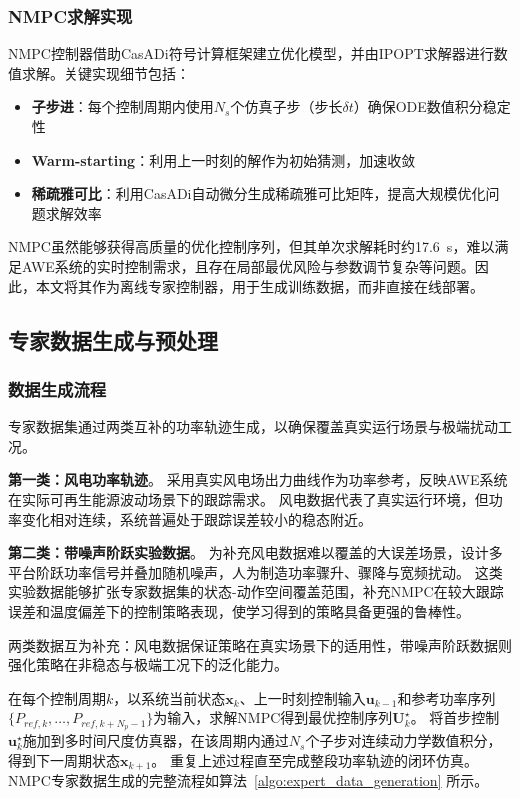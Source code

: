 \subsubsection{NMPC求解实现}

NMPC控制器借助CasADi符号计算框架建立优化模型，并由IPOPT求解器进行数值求解。关键实现细节包括：

\begin{itemize}
  \item \textbf{子步进}：每个控制周期内使用$N_s$个仿真子步（步长$\delta t$）确保ODE数值积分稳定性
  \item \textbf{Warm-starting}：利用上一时刻的解作为初始猜测，加速收敛
  \item \textbf{稀疏雅可比}：利用CasADi自动微分生成稀疏雅可比矩阵，提高大规模优化问题求解效率
\end{itemize}

NMPC虽然能够获得高质量的优化控制序列，但其单次求解耗时约17.6~s，难以满足AWE系统的实时控制需求，且存在局部最优风险与参数调节复杂等问题。因此，本文将其作为离线专家控制器，用于生成训练数据，而非直接在线部署。

\subsection{专家数据生成与预处理}

\subsubsection{数据生成流程}

专家数据集通过两类互补的功率轨迹生成，以确保覆盖真实运行场景与极端扰动工况。

\textbf{第一类：风电功率轨迹}。
采用真实风电场出力曲线作为功率参考，反映AWE系统在实际可再生能源波动场景下的跟踪需求。
风电数据代表了真实运行环境，但功率变化相对连续，系统普遍处于跟踪误差较小的稳态附近。

\textbf{第二类：带噪声阶跃实验数据}。
为补充风电数据难以覆盖的大误差场景，设计多平台阶跃功率信号并叠加随机噪声，人为制造功率骤升、骤降与宽频扰动。
这类实验数据能够扩张专家数据集的状态-动作空间覆盖范围，补充NMPC在较大跟踪误差和温度偏差下的控制策略表现，使学习得到的策略具备更强的鲁棒性。

两类数据互为补充：风电数据保证策略在真实场景下的适用性，带噪声阶跃数据则强化策略在非稳态与极端工况下的泛化能力。

在每个控制周期$k$，以系统当前状态$\mathbf{x}_k$、上一时刻控制输入$\mathbf{u}_{k-1}$和参考功率序列$\{P_{ref,k},\ldots,P_{ref,k+N_p-1}\}$为输入，求解NMPC得到最优控制序列$\mathbf{U}_k^\star$。
将首步控制$\mathbf{u}_k^\star$施加到多时间尺度仿真器，在该周期内通过$N_s$个子步对连续动力学数值积分，得到下一周期状态$\mathbf{x}_{k+1}$。
重复上述过程直至完成整段功率轨迹的闭环仿真。NMPC专家数据生成的完整流程如算法~\ref{algo:expert_data_generation} 所示。

